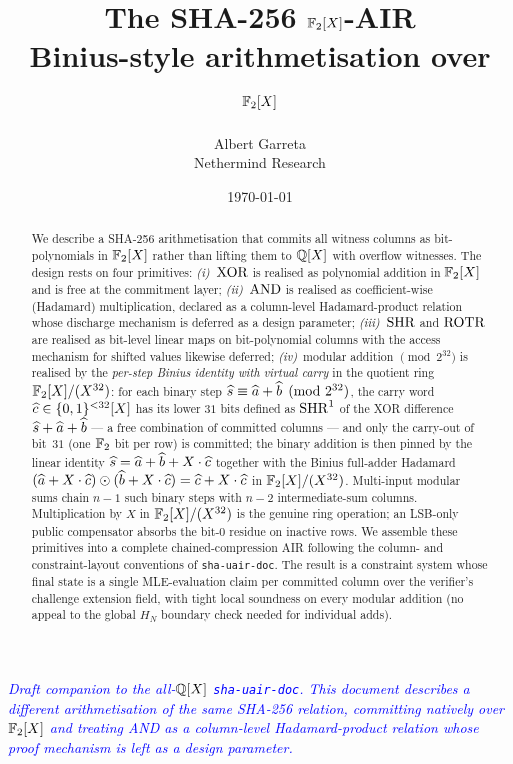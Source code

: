 \documentclass[11pt]{article}
\title{The SHA-256 $\mathbb{F}_2[X]$-AIR \\
       \large Binius-style arithmetisation over $\mathbb{F}_2[X]$}
\author{Albert Garreta \\[2pt] \normalsize Nethermind Research}
\date{\today}
\begin{document}
\maketitle

\begin{center}
\textcolor{blue}{\textit{Draft companion to the all-$\mathbb{Q}[X]$ \texttt{sha-uair-doc}.
This document describes a different arithmetisation of the same SHA-256
relation, committing natively over $\mathbb{F}_2[X]$ and treating AND as a
column-level Hadamard-product relation whose proof mechanism is left
as a design parameter.}}
\end{center}
\vspace{0.5em}

\begin{abstract}
We describe a SHA-256 arithmetisation that commits all witness columns
as bit-polynomials in $\mathbb{F}_2[X]$ rather than lifting them to $\mathbb{Q}[X]$
with overflow witnesses. The design rests on four primitives:
\emph{(i)}~$\operatorname{XOR}$ is realised as polynomial addition in $\mathbb{F}_2[X]$ and
is free at the commitment layer; \emph{(ii)}~$\operatorname{AND}$ is realised as
coefficient-wise (Hadamard) multiplication, declared as a column-level
Hadamard-product relation whose discharge mechanism is deferred as a
design parameter; \emph{(iii)}~$\operatorname{SHR}$ and $\operatorname{ROTR}$ are realised as
bit-level linear maps on bit-polynomial columns with the access
mechanism for shifted values likewise deferred; \emph{(iv)}~modular
addition $\pmod{2^{32}}$ is realised by the \emph{per-step Binius
identity with virtual carry} in the quotient ring $\mathbb{F}_2[X]/(X^{32})$:
for each binary step $\widehat{s} \equiv \widehat{a} + \widehat{b} \pmod{2^{32}}$,
the carry word $\widehat{c} \in \{0,1\}^{<32}[X]$ has its lower $31$ bits
defined as $\operatorname{SHR}^{1}$ of the XOR difference $\widehat{s} + \widehat{a} + \widehat{b}$
— a free combination of committed columns — and only the carry-out
of bit~$31$ (one $\mathbb{F}_2$ bit per row) is committed; the binary
addition is then pinned by the linear identity $\widehat{s} = \widehat{a} +
\widehat{b} + X\cdot\widehat{c}$ together with the Binius full-adder Hadamard
$(\widehat{a} + X\cdot\widehat{c}) \odot (\widehat{b} + X\cdot\widehat{c}) = \widehat{c} +
X\cdot\widehat{c}$ in $\mathbb{F}_2[X]/(X^{32})$. Multi-input modular sums chain
$n - 1$ such binary steps with $n - 2$ intermediate-sum columns.
Multiplication by $X$ in $\mathbb{F}_2[X]/(X^{32})$ is the genuine ring
operation; an LSB-only public compensator absorbs the bit-$0$ residue
on inactive rows. We assemble these primitives into a complete
chained-compression AIR following the column- and constraint-layout
conventions of \texttt{sha-uair-doc}. The result is a constraint
system whose final state is a single MLE-evaluation claim per
committed column over the verifier's challenge extension field, with
tight local soundness on every modular addition (no appeal to the
global $H_N$ boundary check needed for individual adds).
\end{abstract}

\tableofcontents





\end{document}
